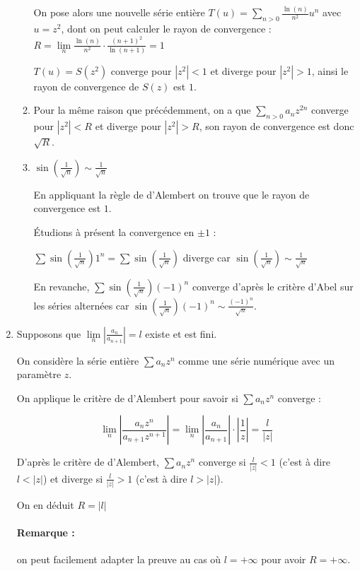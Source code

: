 \documentclass[]{article}
\begin{document}
\begin{enumerate}
\begin{enumerate}
	On pose alors une nouvelle série entière $T(u)=\displaystyle \sum_{n > 0} \frac{\ln(n)}{n^2} u^n$ avec $u=z^2$, dont on peut calculer le rayon de convergence : $R = \lim\limits_{n} \frac{\ln(n)}{n^2} \cdot \frac{(n+1)^2}{\ln(n+1)} = 1$
	
	$T(u)=S(z^2)$ converge pour $|z^2| < 1$ et diverge pour $|z^2| > 1$, ainsi le rayon de convergence de $S(z)$ est $1$.
	
	\item Pour la même raison que précédemment, on a que $\displaystyle \sum_{n > 0} a_n z^{2n}$ converge pour $|z^2| < R$ et diverge pour $|z^2| > R$, son rayon de convergence est donc $\sqrt{R}$.
	
	\item
	$\sin\left(\frac{1}{\sqrt{n}}\right) \sim \frac{1}{\sqrt{n}}$
	
	En appliquant la règle de d'Alembert on trouve que le rayon de convergence est $1$.
	
	Étudions à présent la convergence en $\pm 1$ :
	
	$\sum\sin\left(\frac{1}{\sqrt{n}}\right)1^n=\sum\sin\left(\frac{1}{\sqrt{n}}\right)$ diverge car $\sin\left(\frac{1}{\sqrt{n}}\right) \sim \frac{1}{\sqrt{n}}$
	
	En revanche, $\sum\sin\left(\frac{1}{\sqrt{n}}\right)(-1)^n$ converge d'après le critère d'Abel sur les séries alternées car $\sin\left(\frac{1}{\sqrt{n}}\right)(-1)^n \sim \frac{(-1)^n}{\sqrt{n}}$.
\end{enumerate}

\item Supposons que $\lim\limits_{n} \left|\frac{a_n}{a_{n+1}}\right|=l$ existe et est fini.

On considère la série entière $\sum a_n z^n$ comme une série numérique avec un paramètre $z$.

On applique le critère de d'Alembert pour savoir si $\sum a_n z^n$ converge : 

$$\lim\limits_{n} \left|\frac{a_n z^n}{a_{n+1} z^{n+1}}\right| = \lim\limits_{n} \left|\frac{a_n}{a_{n+1}}\right| \cdot \left|\frac{1}{z}\right| = \frac{l}{|z|}$$

D'après le critère de d'Alembert, $\sum a_n z^n$ converge si $\frac{l}{|z|} < 1$ (c'est à dire $l < |z|$) et diverge si $\frac{l}{|z|} > 1$ (c'est à dire $l > |z|$).

On en déduit $R = |l|$

\paragraph{Remarque :} on peut facilement adapter la preuve au cas où $l = +\infty$ pour avoir $R = +\infty$.


\end{enumerate}
\end{document}
